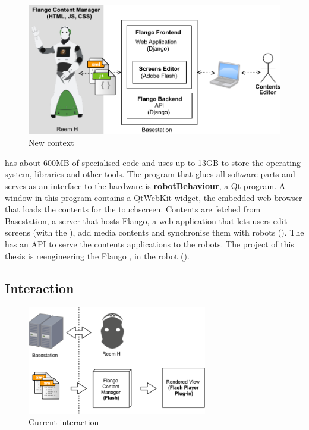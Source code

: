 \begin{figure}[htb]
    \centering
    \includegraphics[width=\textwidth]{figures/context-new}
    \caption{New context}
    \label{fig:context-new}
\end{figure}

 has about 600MB of specialised code and uses up to 13GB to store the operating system, libraries and other tools.
The program that glues all software parts and serves as an interface to the hardware is \textbf{robotBehaviour}, a Qt program.
A window in this program contains a QtWebKit widget, the embedded web browser that loads the contents for the touchscreen.
Contents are fetched from Basestation, a server that hosts Flango, a web application that lets users edit screens (with the \se), add media contents and synchronise them with robots ().
The \flangobe has an \ac{API} to serve the contents applications to the robots.
The project of this thesis is reengineering the Flango \cm , in the robot ().

\FloatBarrier

\subsection{Interaction}
\begin{figure}[htb]
    \centering
    \includegraphics[width=0.7\textwidth]{figures/interaction-original}
    \caption{Current interaction}
    \label{fig:interaction-original}
\end{figure}

